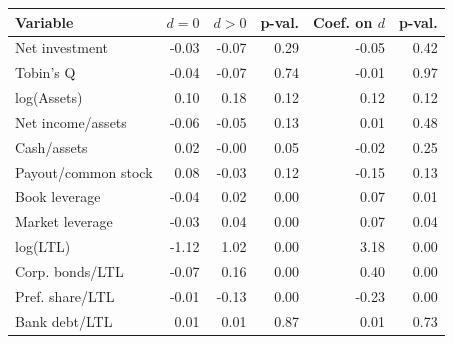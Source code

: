 \begin{threeparttable}
\begin{tabular}{lrrrrr}
\toprule
Variable & \ensuremath{d=0} & \ensuremath{d>0} & p-val. & Coef. on \ensuremath{d} & p-val. \\
\midrule
Net investment & -0.03 & -0.07 & 0.29 & -0.05 & 0.42 \\
Tobin's Q & -0.04 & -0.07 & 0.74 & -0.01 & 0.97 \\
log(Assets) & 0.10 & 0.18 & 0.12 & 0.12 & 0.12 \\
Net income/assets & -0.06 & -0.05 & 0.13 & 0.01 & 0.48 \\
Cash/assets & 0.02 & -0.00 & 0.05 & -0.02 & 0.25 \\
Payout/common stock & 0.08 & -0.03 & 0.12 & -0.15 & 0.13 \\
Book leverage & -0.04 & 0.02 & 0.00 & 0.07 & 0.01 \\
Market leverage & -0.03 & 0.04 & 0.00 & 0.07 & 0.04 \\
log(LTL) & -1.12 & 1.02 & 0.00 & 3.18 & 0.00 \\
Corp. bonds/LTL & -0.07 & 0.16 & 0.00 & 0.40 & 0.00 \\
Pref. share/LTL & -0.01 & -0.13 & 0.00 & -0.23 & 0.00 \\
Bank debt/LTL & 0.01 & 0.01 & 0.87 & 0.01 & 0.73 \\
\bottomrule\end{tabular}\end{threeparttable}

